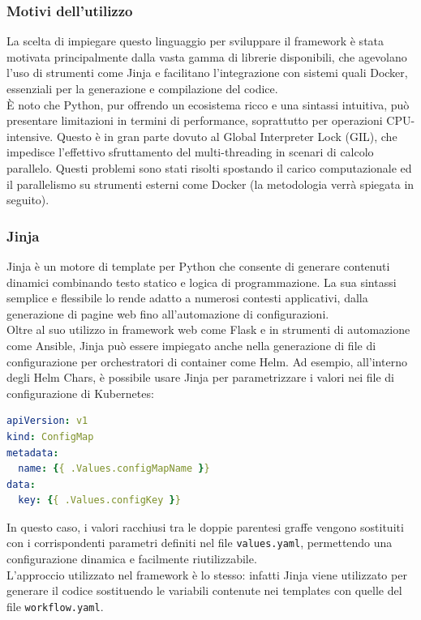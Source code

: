 \subsubsection{Motivi dell'utilizzo}
La scelta di impiegare questo linguaggio per sviluppare il framework è stata motivata principalmente dalla vasta gamma di librerie disponibili, che agevolano l'uso di strumenti come Jinja e facilitano l'integrazione con sistemi quali Docker, essenziali per la generazione e compilazione del codice.\\
È noto che Python, pur offrendo un ecosistema ricco e una sintassi intuitiva, può presentare limitazioni in termini di performance, soprattutto per operazioni CPU-intensive. Questo è in gran parte dovuto al Global Interpreter Lock (GIL), che impedisce l'effettivo sfruttamento del multi-threading in scenari di calcolo parallelo. Questi problemi sono stati risolti spostando il carico computazionale ed il parallelismo su strumenti esterni come Docker (la metodologia verrà spiegata in seguito).

\subsubsection{Jinja}
Jinja è un motore di template per Python che consente di generare contenuti dinamici combinando testo statico e logica di programmazione. La sua sintassi semplice e flessibile lo rende adatto a numerosi contesti applicativi, dalla generazione di pagine web fino all'automazione di configurazioni.\\
Oltre al suo utilizzo in framework web come Flask e in strumenti di automazione come Ansible, Jinja può essere impiegato anche nella generazione di file di configurazione per orchestratori di container come Helm. Ad esempio, all'interno degli Helm Chars, è possibile usare Jinja per parametrizzare i valori nei file di configurazione di Kubernetes:

\begin{lstlisting}[language=yaml]
apiVersion: v1
kind: ConfigMap
metadata:
  name: {{ .Values.configMapName }}
data:
  key: {{ .Values.configKey }}
\end{lstlisting}

In questo caso, i valori racchiusi tra le doppie parentesi graffe vengono sostituiti con i corrispondenti parametri definiti nel file \texttt{values.yaml}, permettendo una configurazione dinamica e facilmente riutilizzabile.\\
L'approccio utilizzato nel framework è lo stesso: infatti Jinja viene utilizzato per generare il codice sostituendo le variabili contenute nei templates con quelle del file \texttt{workflow.yaml}.

